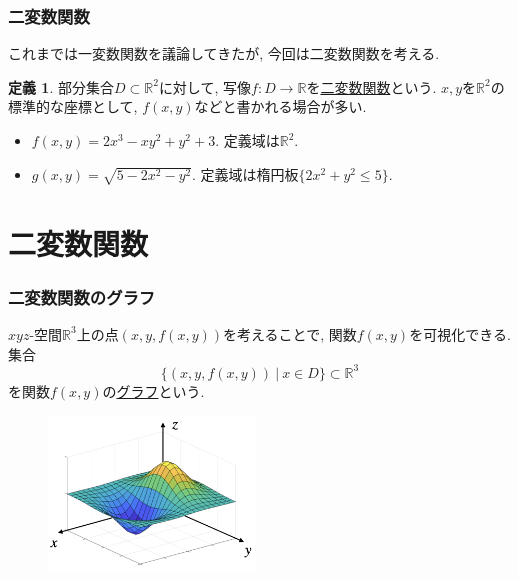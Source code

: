 \documentclass[dvipdfmx,cjk,10.2pt]{beamer}
\newcommand{\R}{\mathbb{R}}
\theoremstyle{definition}
\newtheorem{Def}[Thm]{定義}
\begin{document}
\begin{frame}
\frametitle{二変数関数}


これまでは一変数関数を議論してきたが, 今回は二変数関数を考える. 


\begin{Def}
部分集合$D \subset \R^2$に対して, 写像$f:D\rightarrow \R$を\underline{二変数関数}という. 
$x,y$を$\R^2$の標準的な座標として, $f(x,y)$などと書かれる場合が多い. 
\end{Def}

\begin{itemize}
\item $f(x,y)=2x^3-xy^2+y^2+3$. 定義域は$\R^2$. 
\item $g(x,y)=\sqrt{5-2x^2-y^2}$. 定義域は楕円板$\{2x^2+y^2 \le 5\}$. 

\end{itemize}


\end{frame}






\section{二変数関数}


\begin{frame}
\frametitle{二変数関数のグラフ}


$xyz$-空間$\R^3$上の点$(x,y,f(x,y))$を考えることで, 関数$f(x,y)$を可視化できる. 
集合
$$
\{(x,y,f(x,y)) \ | \ x \in D\} \subset \R^3
$$
を関数$f(x,y)$の\underline{グラフ}という. 

\vspace{-3mm}

\begin{figure}[htbp]
 \begin{center} 
  \includegraphics[width=55mm]{graph3d.png}
 \end{center}
\end{figure}

\vspace{-3mm}

\end{frame}
\end{document}
